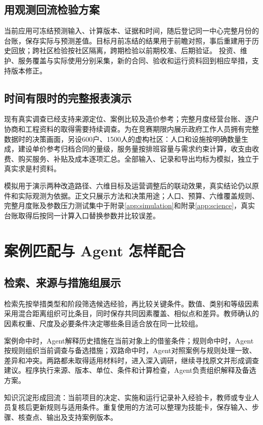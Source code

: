 \documentclass[UTF8,11pt,fontset=windows]{ctexart}
\begin{document}
\subsection{用观测回流检验方案}
当前应用可冻结预测输入、计算版本、证据和时间，随后登记同一中心完整月份的台账，保存实际与预测差值。目标月前冻结的结果用于前瞻对照，事后重建用于历史回放；跨社区检验按社区隔离，跨期检验以前期校准、后期验证。\cite{groupcv} 投资、维护、服务覆盖与实际使用分别采集，新的合同、验收和运行资料回到相应举措，支持版本修正。

\subsection{时间有限时的完整报表演示}
现有真实调查已经支持来源定位、案例比较及造价参考；完整月度经营台账、逐户协商和工程资料的取得需要持续调查。为在竞赛期限内展示政府工作人员拥有完整数据时的决策画面，另设600户、1500人的虚构社区：人口和设施按明确数量生成，建设单价参考归档合同的量级，服务量按排班容量与需求约束计算，收支由收费、购买服务、补贴及成本逐项汇总。全部输入、记录和导出均标为模拟，独立于真实求是村资料。

模拟用于演示两种改造路径、六维目标及运营调整后的联动效果，真实结论仍以原件和实际观测为依据。正文只展示方法和决策用途；人口、预算、六维覆盖规则、完整月度账及参数压力测试集中于附录\ref{app:simulation}和附录\ref{app:science}，真实台账取得后按同一计算入口替换参数并比较误差。


\section{案例匹配与 Agent 怎样配合}
\subsection{检索、来源与措施组展示}

检索先按举措类型和阶段筛选候选经验，再比较关键条件。数值、类别和等级因素采用混合距离组织可比条目，同时保存共同因素覆盖、相似点和差异。教师确认的因素权重、尺度及必要条件决定哪些条目适合放在同一比较组。

案例命中时，Agent解释历史措施在当前对象上的借鉴条件；规则命中时，Agent按规则组织当前调查与备选措施；双路命中时，Agent对照案例与规则处理一致、差异和冲突。两路都未取得适用材料时，进入深入调研，继续寻找原文并形成调查建议。程序执行来源、版本、单位、条件和计算检查，Agent负责组织解释及备选方案。

知识沉淀形成回流：当前项目的决定、实施和运行记录补入经验卡，教师或专业人员复核后更新规则与适用条件。重复使用的方法可以整理为技能卡，保存输入、步骤、核查点、输出及支持案例版本。
\end{document}
